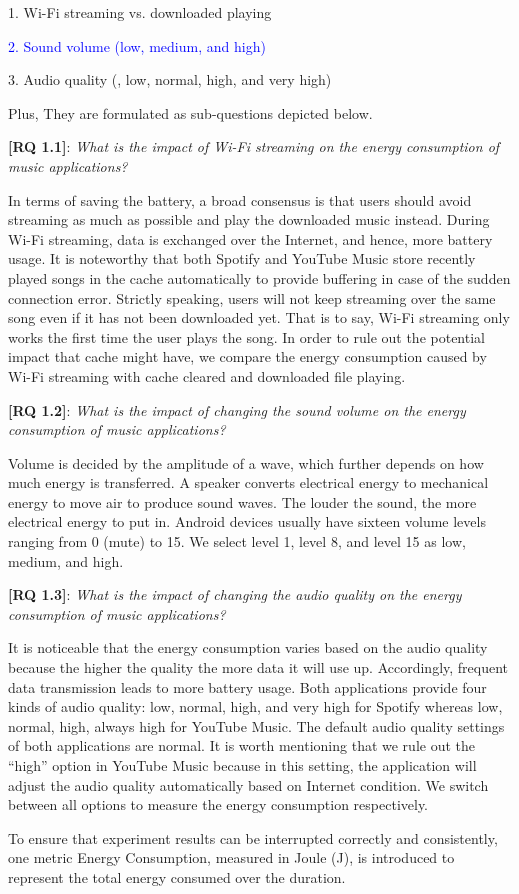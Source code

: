 1. Wi-Fi streaming vs. downloaded playing

\textcolor{blue}{2. Sound volume (\ie low, medium, and high)}

3. Audio quality (\ie , low, normal, high, and very high)

Plus,  They are formulated as sub-questions depicted below.  

  

\textbf{[RQ 1.1]}: \emph{What is the impact of Wi-Fi streaming on the energy consumption of music applications?}

In terms of saving the battery, a broad consensus is that users should avoid streaming as much as possible and play the downloaded music instead. During Wi-Fi streaming, data is exchanged over the Internet, and hence, more battery usage. It is noteworthy that both Spotify and YouTube Music store recently played songs in the cache automatically to provide buffering in case of the sudden connection error. Strictly speaking, users will not keep streaming over the same song even if it has not been downloaded yet. That is to say, Wi-Fi streaming only works the first time the user plays the song. In order to rule out the potential impact that cache might have, we compare the energy consumption caused by Wi-Fi streaming with cache cleared and downloaded file playing. 


{\color{blue}\textbf{[RQ 1.2]}: \emph{What is the impact of changing the sound volume on the energy consumption of music applications?}

Volume is decided by the amplitude of a wave, which further depends on how much energy is transferred. A speaker converts electrical energy to mechanical energy to move air to produce sound waves. The louder the sound, the more electrical energy to put in. Android devices usually have sixteen volume levels ranging from 0 (\ie mute) to 15. We select level 1, level 8, and level 15 as low, medium, and high.}

\textbf{[RQ 1.3]}: \emph{What is the impact of changing the audio quality on the energy consumption of music applications?}

 It is noticeable that the energy consumption varies based on the audio quality because the higher the quality the more data it will use up. Accordingly, frequent data transmission leads to more battery usage. {\color{blue}Both applications provide four kinds of audio quality: low, normal, high, and very high for Spotify whereas low, normal, high, always high for YouTube Music. The default audio quality settings of both applications are normal. It is worth mentioning that we rule out the “high” option in YouTube Music because in this setting, the application will adjust the audio quality automatically based on Internet condition.} We switch between all options to measure the energy consumption respectively. 
 
To ensure that experiment results can be interrupted correctly and consistently, one metric Energy Consumption, measured in Joule (J), is introduced to represent the total energy consumed over the duration. 






